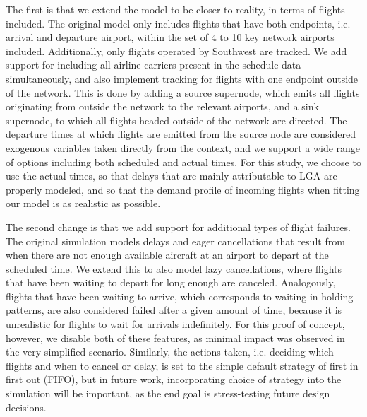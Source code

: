 The first is that we extend the model to be closer to reality, in terms of flights included. The original model only includes flights that have both endpoints, i.e. arrival and departure airport, within the set of 4 to 10 key network airports included. Additionally, only flights operated by Southwest are tracked. We add support for including all airline carriers present in the schedule data simultaneously, and also implement tracking for flights with one endpoint outside of the network. This is done by adding a source supernode, which emits all flights originating from outside the network to the relevant airports, and a sink supernode, to which all flights headed outside of the network are directed. The departure times at which flights are emitted from the source node are considered exogenous variables taken directly from the context, and we support a wide range of options including both scheduled and actual times. For this study, we choose to use the actual times, so that delays that are mainly attributable to LGA are properly modeled, and so that the demand profile of incoming flights when fitting our model is as realistic as possible.

The second change is that we add support for additional types of flight failures. The original simulation models delays and eager cancellations that result from when there are not enough available aircraft at an airport to depart at the scheduled time. We extend this to also model lazy cancellations, where flights that have been waiting to depart for long enough are canceled. Analogously, flights that have been waiting to arrive, which corresponds to waiting in holding patterns, are also considered failed after a given amount of time, because it is unrealistic for flights to wait for arrivals indefinitely. For this proof of concept, however, we disable both of these features, as minimal impact was observed in the very simplified scenario. Similarly, the actions taken, i.e. deciding which flights and when to cancel or delay, is set to the simple default strategy of first in first out (FIFO), but in future work, incorporating choice of strategy into the simulation will be important, as the end goal is stress-testing future design decisions.

